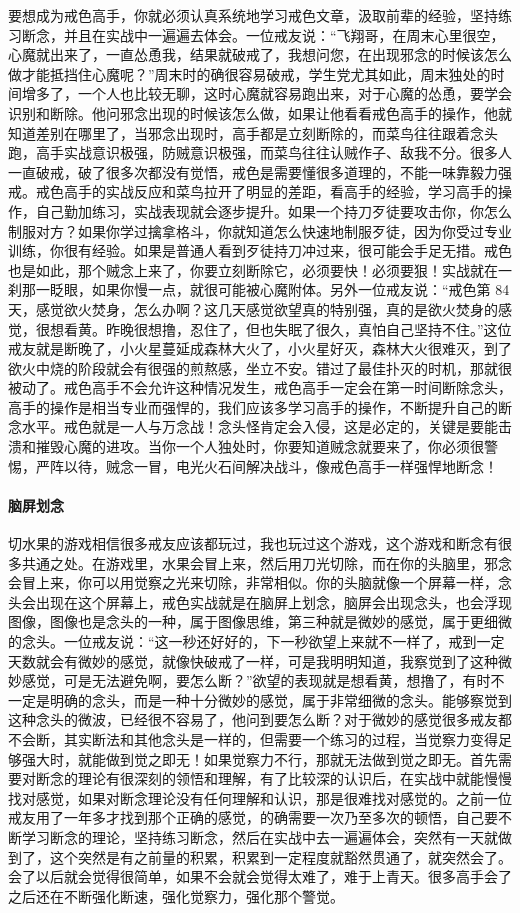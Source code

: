 要想成为戒色高手，你就必须认真系统地学习戒色文章，汲取前辈的经验，坚持练习断念，并且在实战中一遍遍去体会。一位戒友说：“飞翔哥，在周末心里很空，心魔就出来了，一直怂恿我，结果就破戒了，我想问您，在出现邪念的时候该怎么做才能抵挡住心魔呢？”周末时的确很容易破戒，学生党尤其如此，周末独处的时间增多了，一个人也比较无聊，这时心魔就容易跑出来，对于心魔的怂恿，要学会识别和断除。他问邪念出现的时候该怎么做，如果让他看看戒色高手的操作，他就知道差别在哪里了，当邪念出现时，高手都是立刻断除的，而菜鸟往往跟着念头跑，高手实战意识极强，防贼意识极强，而菜鸟往往认贼作子、敌我不分。很多人一直破戒，破了很多次都没有觉悟，戒色是需要懂很多道理的，不能一味靠毅力强戒。戒色高手的实战反应和菜鸟拉开了明显的差距，看高手的经验，学习高手的操作，自己勤加练习，实战表现就会逐步提升。如果一个持刀歹徒要攻击你，你怎么制服对方？如果你学过擒拿格斗，你就知道怎么快速地制服歹徒，因为你受过专业训练，你很有经验。如果是普通人看到歹徒持刀冲过来，很可能会手足无措。戒色也是如此，那个贼念上来了，你要立刻断除它，必须要快！必须要狠！实战就在一刹那一眨眼，如果你慢一点，就很可能被心魔附体。另外一位戒友说：“戒色第 84 天，感觉欲火焚身，怎么办啊？这几天感觉欲望真的特别强，真的是欲火焚身的感觉，很想看黄。昨晚很想撸，忍住了，但也失眠了很久，真怕自己坚持不住。”这位戒友就是断晚了，小火星蔓延成森林大火了，小火星好灭，森林大火很难灭，到了欲火中烧的阶段就会有很强的煎熬感，坐立不安。错过了最佳扑灭的时机，那就很被动了。戒色高手不会允许这种情况发生，戒色高手一定会在第一时间断除念头，高手的操作是相当专业而强悍的，我们应该多学习高手的操作，不断提升自己的断念水平。戒色就是一人与万念战！念头怪肯定会入侵，这是必定的，关键是要能击溃和摧毁心魔的进攻。当你一个人独处时，你要知道贼念就要来了，你必须很警惕，严阵以待，贼念一冒，电光火石间解决战斗，像戒色高手一样强悍地断念！

\paragraph{脑屏划念}

切水果的游戏相信很多戒友应该都玩过，我也玩过这个游戏，这个游戏和断念有很多共通之处。在游戏里，水果会冒上来，然后用刀光切除，而在你的头脑里，邪念会冒上来，你可以用觉察之光来切除，非常相似。你的头脑就像一个屏幕一样，念头会出现在这个屏幕上，戒色实战就是在脑屏上划念，脑屏会出现念头，也会浮现图像，图像也是念头的一种，属于图像思维，第三种就是微妙的感觉，属于更细微的念头。一位戒友说：“这一秒还好好的，下一秒欲望上来就不一样了，戒到一定天数就会有微妙的感觉，就像快破戒了一样，可是我明明知道，我察觉到了这种微妙感觉，可是无法避免啊，要怎么断？”欲望的表现就是想看黄，想撸了，有时不一定是明确的念头，而是一种十分微妙的感觉，属于非常细微的念头。能够察觉到这种念头的微波，已经很不容易了，他问到要怎么断？对于微妙的感觉很多戒友都不会断，其实断法和其他念头是一样的，但需要一个练习的过程，当觉察力变得足够强大时，就能做到觉之即无！如果觉察力不行，那就无法做到觉之即无。首先需要对断念的理论有很深刻的领悟和理解，有了比较深的认识后，在实战中就能慢慢找对感觉，如果对断念理论没有任何理解和认识，那是很难找对感觉的。之前一位戒友用了一年多才找到那个正确的感觉，的确需要一次乃至多次的顿悟，自己要不断学习断念的理论，坚持练习断念，然后在实战中去一遍遍体会，突然有一天就做到了，这个突然是有之前量的积累，积累到一定程度就豁然贯通了，就突然会了。会了以后就会觉得很简单，如果不会就会觉得太难了，难于上青天。很多高手会了之后还在不断强化断速，强化觉察力，强化那个警觉。


